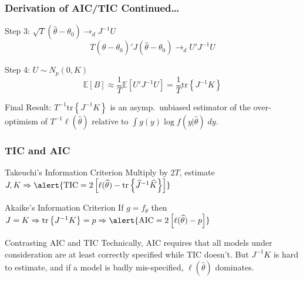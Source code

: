 \begin{frame}
  \frametitle{Derivation of AIC/TIC Continued\dots}
  \begin{block}{Step 3: $\sqrt{T}(\widehat{\theta} - \theta_0) \rightarrow_d J^{-1}U$}
    \vspace{-1.5em}
    \[
      T(\widehat{\theta} - \theta_0)'J(\widehat{\theta} - \theta_0) \rightarrow_d U'J^{-1}U
    \]
  \end{block}

  \pause
  
  \begin{block}{Step 4: $U \sim N_p(0, K)$}
    \vspace{-1.5em}
   \[
     \mathbb{E}[B] \approx \frac{1}{T} \mathbb{E}[U'J^{-1}U] = \frac{1}{T} \text{tr}\left\{ J^{-1}K \right\}
   \]
  \end{block}

  \pause

  \vspace{-1em}

  \begin{block}{Final Result:}
    $T^{-1}\text{tr}\left\{ J^{-1}K \right\}$ is an asymp.\ unbiased estimator of the over-optimism of $T^{-1}\ell(\widehat{\theta})$ relative to $\int g(y)\log f(y|\widehat{\theta})\; dy$.
  \end{block}

\end{frame}
\begin{frame}
  \frametitle{TIC and AIC}
  \begin{block}{Takeuchi's Information Criterion}
    Multiply by $2T$, estimate $J,K \Rightarrow \alert{\text{TIC} = 2\left[ \ell(\widehat{\theta}) - \text{tr}\left\{ \widehat{J}^{-1}\widehat{K} \right\} \right]}$
  \end{block}

  \pause

  \begin{block}{Akaike's Information Criterion}
    If $g = f_\theta$ then $J = K \Rightarrow \text{tr}\left\{ J^{-1  }K \right\} = p \Rightarrow \alert{\text{AIC} = 2\left[ \ell(\widehat{\theta}) - p \right]}$ 
  \end{block}

  \pause

  \begin{block}{Contrasting AIC and TIC} 
    Technically, AIC requires that all models under consideration are at least correctly specified while TIC doesn't. 
    But $J^{-1}K$ is hard to estimate, and if a model is badly mis-specified, $\ell(\widehat{\theta})$ dominates.
  \end{block}

\end{frame}
